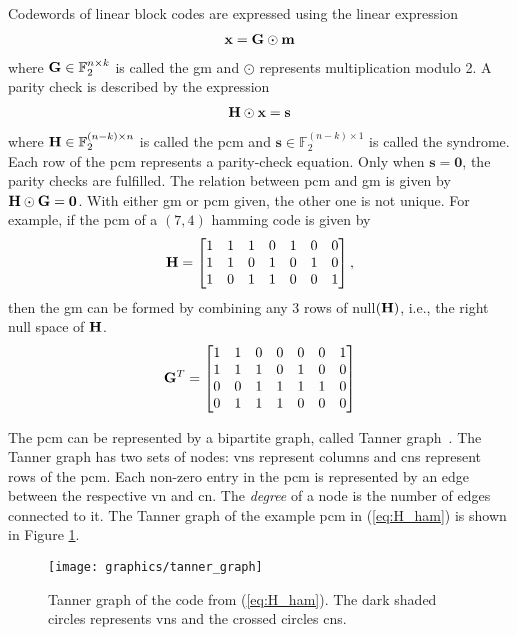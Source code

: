 Codewords of linear block codes are expressed using the linear expression \begin{align}\mathbf{x}=\mathbf{G}\odot\mathbf{m}\end{align} where $\mathbf{G}\in\mathbb{F}_2^{n\times k}$ is called the \ac{gm} and $\odot$ represents multiplication modulo 2. A parity check is described by the expression \begin{align}\mathbf{H}\odot\mathbf{x}=\mathbf{s}\end{align} where $\mathbf{H}\in\mathbb{F}_2^{(n-k)\times n}$ is called the \ac{pcm} and $\mathbf{s}\in\mathbb{F}_2^{(n-k)\times 1}$ is called the syndrome. Each row of the \ac{pcm} represents a parity-check equation. Only when $\mathbf{s}=\mathbf{0}$, the parity checks are fulfilled. The relation between \ac{pcm} and \ac{gm} is given by $\mathbf{H}\odot\mathbf{G}=\mathbf{0}$. With either \ac{gm} or \ac{pcm} given, the other one is not unique. For example, if the \ac{pcm} of a $(7,4)$ hamming code is given by
\begin{align} \label{eq:H_ham}
\mathbf{H} =
\begin{bmatrix}
1 &1 &1 &0 &1 &0 &0 \\
1 &1 &0 &1 &0 &1 &0 \\
1 &0 &1 &1 &0 &0 &1
\end{bmatrix},
\end{align}
then the \ac{gm} can be formed by combining any 3 rows of null$(\mathbf{H})$, i.e., the right null space of $\mathbf{H}$.
\begin{align} \label{eq:G_ham}
\mathbf{G}^T =
\begin{bmatrix}
1 &1 &0 &0 &0 &0 &1 \\
1 &1 &1 &0 &1 &0 &0 \\
0 &0 &1 &1 &1 &1 &0 \\
0 &1 &1 &1 &0 &0 &0
\end{bmatrix}
\end{align}

The \ac{pcm} can be represented by a bipartite graph, called Tanner graph~\cite{Tanner1981}. The Tanner graph has two sets of nodes: \acp{vn} represent columns and \acp{cn} represent rows of the \ac{pcm}. Each non-zero entry in the \ac{pcm} is represented by an edge between the respective \ac{vn} and \ac{cn}. The \emph{degree} of a node is the number of edges connected to it. The Tanner graph of the example \ac{pcm} in (\ref{eq:H_ham}) is shown in Figure \ref{fig:tannGraph}.

\begin{figure}[htbp]
  \centering
  \texttt{[image: graphics/tanner\_graph]}
  \caption{Tanner graph of the code from (\ref{eq:H_ham}). The dark shaded circles represents \acp{vn} and the crossed circles \acp{cn}.}
  \label{fig:tannGraph}
\end{figure}

